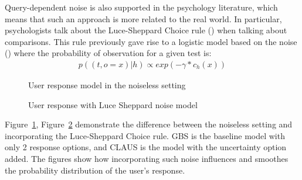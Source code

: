 \documentclass[
  letterpaper,
  numbers=noenddot,
  DIV=11,
  oneside]{scrreprt}
\theoremstyle{remark}
\begin{document}
Query-dependent noise is also supported in the psychology literature,
which means that such an approach is more related to the real world. In
particular, psychologists talk about the Luce-Sheppard Choice rule
() when talking about comparisons.
This rule previously gave rise to a logistic model based on the noise
() where the
probability of observation for a given test is: \[\begin{aligned}
    p((t, o = x) | h) \propto exp(-\gamma * c_h(x))
    \label{eq:noise_model}
\end{aligned}\]

\begin{figure}


\caption{\label{fig-noiseless_1}User response model in the noiseless
setting}

\end{figure}%

\begin{figure}


\caption{\label{fig-noiseless_2}User response with Luce Sheppard noise
model}

\end{figure}%

Figure~\ref{fig-noiseless_1}, Figure~\ref{fig-noiseless_2} demonstrate
the difference between the noiseless setting and incorporating the
Luce-Sheppard Choice rule. GBS is the baseline model with only 2
response options, and CLAUS is the model with the uncertainty option
added. The figures show how incorporating such noise influences and
smoothes the probability distribution of the user's response.
\end{document}
